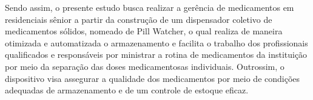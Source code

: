 Sendo assim, o presente estudo busca realizar a gerência de medicamentos em residenciais sênior a partir da construção de um dispensador coletivo de medicamentos sólidos, nomeado de Pill Watcher, o qual realiza de maneira otimizada e automatizada o armazenamento e facilita o trabalho dos profissionais qualificados e responsáveis por ministrar a rotina de medicamentos da instituição por meio da separação das doses medicamentosas individuais. Outrossim, o dispositivo visa assegurar a qualidade dos medicamentos por meio de condições adequadas de armazenamento e de um controle de estoque eficaz.
